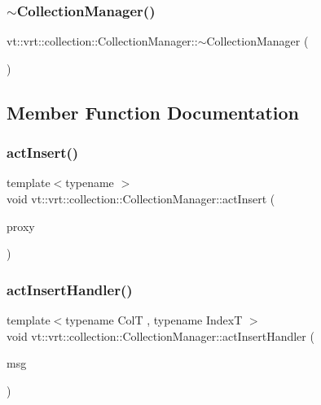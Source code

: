 \subsubsection{\texorpdfstring{$\sim$\+Collection\+Manager()}{~CollectionManager()}}
{\footnotesize\ttfamily vt\+::vrt\+::collection\+::\+Collection\+Manager\+::$\sim$\+Collection\+Manager (\begin{DoxyParamCaption}{ }\end{DoxyParamCaption})\hspace{0.3cm}{\ttfamily [virtual]}}



\subsection{Member Function Documentation}
\mbox{\label{structvt_1_1vrt_1_1collection_1_1_collection_manager_aba521bf30580ffe5a815b5e50bfbcbfe}} 
\subsubsection{\texorpdfstring{act\+Insert()}{actInsert()}}
{\footnotesize\ttfamily template$<$typename $>$ \\
void vt\+::vrt\+::collection\+::\+Collection\+Manager\+::act\+Insert (\begin{DoxyParamCaption}\item[{\hyperlink{namespacevt_a1b417dd5d684f045bb58a0ede70045ac}{Virtual\+Proxy\+Type} const \&}]{proxy }\end{DoxyParamCaption})}

\mbox{\label{structvt_1_1vrt_1_1collection_1_1_collection_manager_a0c2b3a0d98264432181392ff178d5782}} 
\subsubsection{\texorpdfstring{act\+Insert\+Handler()}{actInsertHandler()}}
{\footnotesize\ttfamily template$<$typename ColT , typename IndexT $>$ \\
void vt\+::vrt\+::collection\+::\+Collection\+Manager\+::act\+Insert\+Handler (\begin{DoxyParamCaption}\item[{\hyperlink{structvt_1_1vrt_1_1collection_1_1_act_insert_msg}{Act\+Insert\+Msg}$<$ ColT, IndexT $>$ $\ast$}]{msg }\end{DoxyParamCaption})\hspace{0.3cm}{\ttfamily [static]}}

